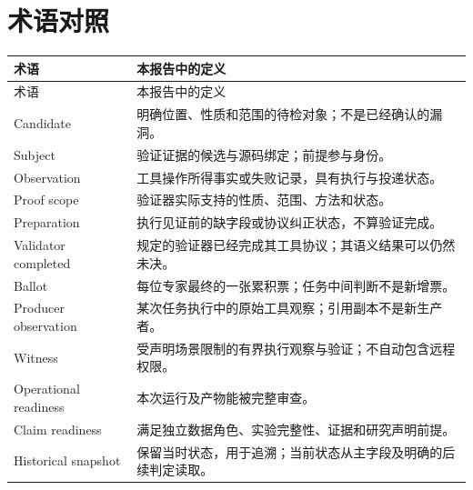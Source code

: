 \documentclass[UTF8,a4paper,zihao=-4,fontset=none]{ctexart}
\begin{document}
\section{术语对照}
\begin{longtable}{L{45mm}L{104mm}}
\toprule 术语 & 本报告中的定义\\\midrule\endfirsthead
\toprule 术语 & 本报告中的定义\\\midrule\endhead
Candidate & 明确位置、性质和范围的待检对象；不是已经确认的漏洞。\\
Subject & 验证证据的候选与源码绑定；前提参与身份。\\
Observation & 工具操作所得事实或失败记录，具有执行与投递状态。\\
Proof scope & 验证器实际支持的性质、范围、方法和状态。\\
Preparation & 执行见证前的缺字段或协议纠正状态，不算验证完成。\\
Validator completed & 规定的验证器已经完成其工具协议；其语义结果可以仍然未决。\\
Ballot & 每位专家最终的一张累积票；任务中间判断不是新增票。\\
Producer observation & 某次任务执行中的原始工具观察；引用副本不是新生产者。\\
Witness & 受声明场景限制的有界执行观察与验证；不自动包含远程权限。\\
Operational readiness & 本次运行及产物能被完整审查。\\
Claim readiness & 满足独立数据角色、实验完整性、证据和研究声明前提。\\
Historical snapshot & 保留当时状态，用于追溯；当前状态从主字段及明确的后续判定读取。\\
\bottomrule
\end{longtable}
\end{document}
